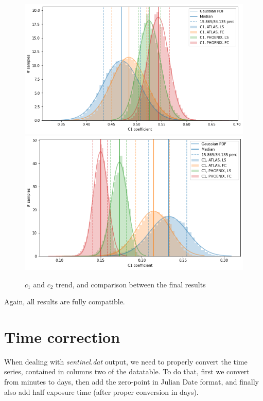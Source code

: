 \documentclass[a4paper,11pt,twocolumn]{article}
\begin{document}
\begin{figure}[H]
    \includegraphics[scale=0.35, angle=0]{../pictures/Claret2011/c1_comp.png}
    \includegraphics[scale=0.35, angle=0]{../pictures/Claret2011/c2_comp.png}
    \caption{$c_1$ and $c_2$ trend, and comparison between the final results}
\end{figure}
Again, all results are fully compatible.

\section{Time correction}
When dealing with \textit{sentinel.dat} output, we need to properly convert the 
time series, contained in columns two of the datatable. To do that, first we
convert from minutes to days, then add the zero-point in Julian Date format, and 
finally also add half exposure time (after proper conversion in days).
\end{document}
